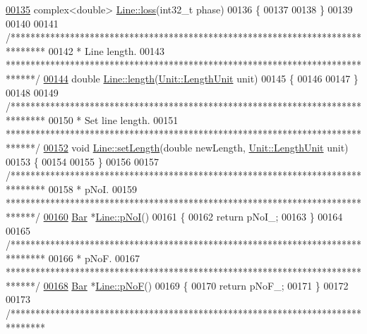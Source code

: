 \begin{DoxyCode}
\hypertarget{line_8cpp_source_l00135}{}\hyperlink{group___models_ga84ddf17bee846a6f21c44d463252dd25}{00135} complex<double> \hyperlink{group___models_ga84ddf17bee846a6f21c44d463252dd25}{Line::loss}(int32\_t phase)
00136 \{
00137 
00138 \}
00139 
00140 
00141 \textcolor{comment}{/*******************************************************************************}
00142 \textcolor{comment}{ * Line length.}
00143 \textcolor{comment}{ ******************************************************************************/}
\hypertarget{line_8cpp_source_l00144}{}\hyperlink{group___models_gae2e4500d0fa60dcc2ecb08b2c96954f9}{00144} \textcolor{keywordtype}{double} \hyperlink{group___models_gae2e4500d0fa60dcc2ecb08b2c96954f9}{Line::length}(\hyperlink{class_unit_a8c8921f7b225ad6063b1cb573425b9a0}{Unit::LengthUnit} unit)
00145 \{
00146 
00147 \}
00148 
00149 \textcolor{comment}{/*******************************************************************************}
00150 \textcolor{comment}{ * Set line length.}
00151 \textcolor{comment}{ ******************************************************************************/}
\hypertarget{line_8cpp_source_l00152}{}\hyperlink{group___models_ga950d0b8f5d167eda430c65ca7adadbb0}{00152} \textcolor{keywordtype}{void} \hyperlink{group___models_ga950d0b8f5d167eda430c65ca7adadbb0}{Line::setLength}(\textcolor{keywordtype}{double} newLength, \hyperlink{class_unit_a8c8921f7b225ad6063b1cb573425b9a0}{Unit::LengthUnit} unit)
00153 \{
00154 
00155 \}
00156 
00157 \textcolor{comment}{/*******************************************************************************}
00158 \textcolor{comment}{ * pNoI.}
00159 \textcolor{comment}{ ******************************************************************************/}
\hypertarget{line_8cpp_source_l00160}{}\hyperlink{group___models_gaeafd90e84ac2f8de2a879abe9e53eef3}{00160} \hyperlink{class_bar}{Bar} *\hyperlink{group___models_gaeafd90e84ac2f8de2a879abe9e53eef3}{Line::pNoI}()
00161 \{
00162   \textcolor{keywordflow}{return} pNoI\_;
00163 \}
00164 
00165 \textcolor{comment}{/*******************************************************************************}
00166 \textcolor{comment}{ * pNoF.}
00167 \textcolor{comment}{ ******************************************************************************/}
\hypertarget{line_8cpp_source_l00168}{}\hyperlink{group___models_gabbc73ddedd3075c33ae5331bd7c9829f}{00168} \hyperlink{class_bar}{Bar} *\hyperlink{group___models_gabbc73ddedd3075c33ae5331bd7c9829f}{Line::pNoF}()
00169 \{
00170   \textcolor{keywordflow}{return} pNoF\_;
00171 \}
00172 
00173 \textcolor{comment}{/*******************************************************************************}

\end{DoxyCode}
